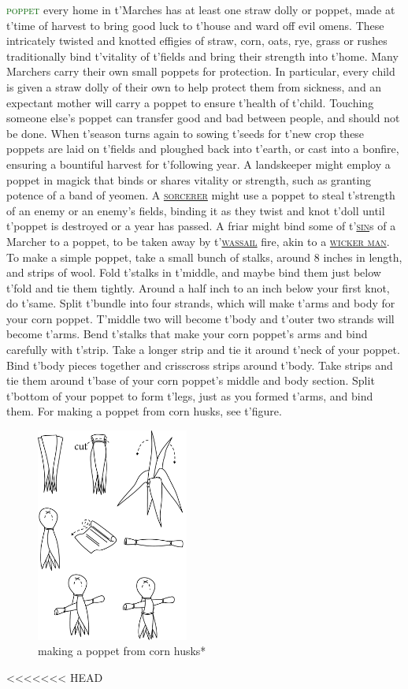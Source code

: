 \documentclass[twoside,11pt,b5paper,twocolumn]{scrbook}
\newcommand{\estcab}[1]{\textsc{\textcolor{marron}{#1}}}
\newcommand{\keyword}[1]{\textcolor{darkgreen}{#1}}
\renewcommand{\paragraph}[1]{\par\noindent\markboth{#1}{#1}\estcab{\keyword{#1}}\label{#1} }
\newcommand{\see}[1]{{\estcab{\hyperref[#1]{#1}}}}
\begin{document}
\paragraph{poppet} every home in t'Marches has at least one straw dolly or poppet, made at t'time of harvest to bring good luck to t'house and ward off evil omens. These intricately twisted and knotted effigies of straw, corn, oats, rye, grass or rushes traditionally bind t'vitality of t'fields and bring their strength into t'home. Many Marchers carry their own small poppets for protection. In particular, every child is given a straw dolly of their own to help protect them from sickness, and an expectant mother will carry a poppet to ensure t'health of t'child. Touching someone else’s poppet can transfer good and bad between people, and should not be done. When t'season turns again to sowing t'seeds for t'new crop these poppets are laid on t'fields and ploughed back into t'earth, or cast into a bonfire, ensuring a bountiful harvest for t'following year. A landskeeper might employ a poppet in magick that binds or shares vitality or strength, such as granting potence of a band of yeomen. A \see{sorcerer} might use a poppet to steal t'strength of an enemy or an enemy's fields, binding it as they twist and knot t'doll until t'poppet is destroyed or a year has passed. A friar might bind some of t'\see{sin}s of a Marcher to a poppet, to be taken away by t'\see{wassail} fire, akin to a \see{wicker man}. To make a simple poppet, take a small bunch of stalks, around 8 inches in length, and strips of wool. Fold t'stalks in t'middle, and maybe bind them just below t'fold and tie them tightly. Around a half inch to an inch below your first knot, do t'same. Split t'bundle into four strands, which will make t'arms and body for your corn poppet. T'middle two will become t'body and t'outer two strands will become t'arms. Bend t'stalks that make your corn poppet’s arms and bind carefully with t'strip. Take a longer strip and tie it around t'neck of your poppet. Bind t'body pieces together and crisscross strips around t'body. Take strips and tie them around t'base of your corn poppet’s middle and body section. Split t'bottom of your poppet to form t'legs, just as you formed t'arms, and bind them. For making a poppet from corn husks, see t'figure.\begin{figure}\centering\includegraphics[width=5cm]{encyclopedia/poppet}\caption{making a poppet from corn husks*}\end{figure}
<<<<<<< HEAD
\end{document}
